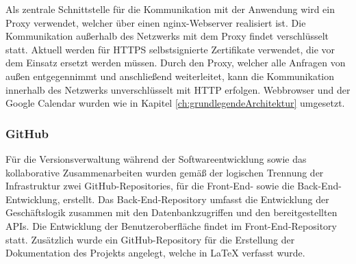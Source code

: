 Als zentrale Schnittstelle für die Kommunikation mit der Anwendung wird ein Proxy verwendet, welcher über einen nginx-Webserver realisiert ist.
Die Kommunikation außerhalb des Netzwerks mit dem Proxy findet verschlüsselt statt.
Aktuell werden für \acs{HTTPS} selbstsignierte Zertifikate verwendet, die vor dem Einsatz ersetzt werden müssen.
Durch den Proxy, welcher alle Anfragen von außen entgegennimmt und anschließend weiterleitet, kann die Kommunikation innerhalb des Netzwerks unverschlüsselt mit \acs{HTTP} erfolgen.
Webbrowser und der Google Calendar wurden wie in Kapitel \vref{ch:grundlegendeArchitektur} umgesetzt.

\subsubsection{GitHub}
Für die Versionsverwaltung während der Softwareentwicklung sowie das kollaborative Zusammenarbeiten wurden gemäß der logischen Trennung der Infrastruktur zwei GitHub-Repositories, für die Front-End- sowie die Back-End-Entwicklung, erstellt.
Das Back-End-Repository umfasst die Entwicklung der Geschäftslogik zusammen mit den Datenbankzugriffen und den bereitgestellten \ac{API}s.
Die Entwicklung der Benutzeroberfläche findet im Front-End-Repository statt.
Zusätzlich wurde ein GitHub-Repository für die Erstellung der Dokumentation des Projekts angelegt, welche in LaTeX verfasst wurde.
